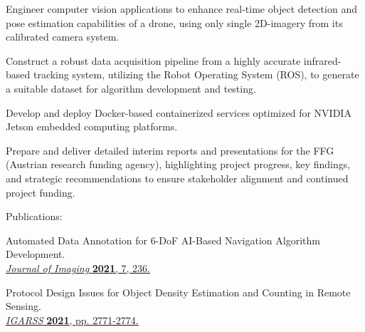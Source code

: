 \begin{tightemize}
    \item Engineer computer vision applications to enhance real-time object detection and pose estimation capabilities of a drone, using only single 2D-imagery from its calibrated camera system.
    \item Construct a robust data acquisition pipeline from a highly accurate infrared-based tracking system, utilizing the Robot Operating System (ROS), to generate a suitable dataset for algorithm development and testing.
    \item Develop and deploy Docker-based containerized services optimized for NVIDIA Jetson embedded computing platforms.
    \item Prepare and deliver detailed interim reports and presentations for the FFG (Austrian research funding agency), highlighting project progress, key findings, and strategic recommendations to ensure stakeholder alignment and continued project funding.
\end{tightemize}
\medsep
\textsf{Publications:}
\begin{tightemize}
    \item Automated Data Annotation for 6-DoF AI-Based Navigation Algorithm Development. \\\href{https://doi.org/10.3390/jimaging7110236}{\textit{Journal of Imaging} \textbf{2021}, 7, 236.}
    \item Protocol Design Issues for Object Density Estimation and Counting in Remote Sensing. \\\href{https://doi.org/10.1109/IGARSS47720.2021.9553934}{\textit{IGARSS} \textbf{2021}, pp. 2771-2774.}
\end{tightemize}